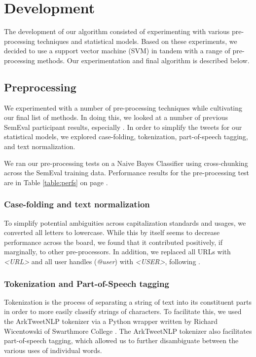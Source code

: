 \section{Development}

The development of our algorithm consisted of experimenting with various pre-processing techniques and statistical models. Based on these experiments, we decided to use a support vector machine (SVM) in tandem with a range of pre-processing methods. Our experimentation and final algorithm is described below.

\subsection{Preprocessing} 
We experimented with a number of pre-processing techniques while cultivating our final list of methods. In doing this, we looked at a number of previous SemEval participant results, especially \citet{tugas, choco, nrc}. In order to simplify the tweets for our statistical models, we explored case-folding, tokenization, part-of-speech tagging, and text normalization. 

We ran our pre-processing tests on a Naive Bayes Classifier using cross-chunking across the SemEval training data. Performance results for the pre-processing test are in Table \ref{table:perfs} on page \pageref{table:perfs}.

\subsubsection{Case-folding and text normalization}
To simplify potential ambiguities across capitalization standards and usages, we converted all letters to lowercase. While this by itself seems to decrease performance across the board, we found that it contributed positively, if marginally, to other pre-processors. In addition, we replaced all URLs with \textit{<URL>} and all user handles (\textit{@user}) with \textit{<USER>}, following \citet{tugas}.

\subsubsection{Tokenization and Part-of-Speech tagging}
Tokenization is the process of separating a string of text into its constituent parts in order to more easily classify strings of characters. To facilitate this, we used the ArkTweetNLP tokenizer via a Python wrapper written by Richard Wicentowski of Swarthmore College \citep{ark}. The ArkTweetNLP tokenizer also facilitates part-of-speech tagging, which allowed us to further disambiguate between the various uses of individual words.

